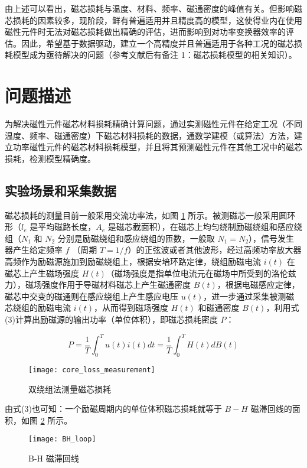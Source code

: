 \documentclass[a4paper,12pt]{ctexart}
\begin{document}
由上述可以看出，磁芯损耗与温度、材料、频率、磁通密度的峰值有关。但影响磁芯损耗的因素较多，现阶段，鲜有普遍适用并且精度高的模型，这使得业内在使用磁性元件时无法对磁芯损耗做出精确的评估，进而影响到对功率变换器效率的评估。因此，希望基于数据驱动，建立一个高精度并且普遍适用于各种工况的磁芯损耗模型成为亟待解决的问题（参考文献后有备注 1：磁芯损耗模型的相关知识）。

\section{问题描述}

为解决磁性元件磁芯材料损耗精确计算问题，通过实测磁性元件在给定工况（不同温度、频率、磁通密度）下磁芯材料损耗的数据，通数学建模（或算法）方法，建立功率磁性元件的磁芯材料损耗模型，并且将其预测磁性元件在其他工况中的磁芯损耗，检测模型精确度。

\subsection{实验场景和采集数据}

磁芯损耗的测量目前一般采用交流功率法，如图 \ref{fig:core_loss_measurement} 所示。被测磁芯一般采用圆环形（$l_e$ 是平均磁路长度，$A_e$ 是磁芯截面积），在磁芯上均匀绕制励磁绕组和感应绕组（$N_1$ 和 $N_2$ 分别是励磁绕组和感应绕组的匝数，一般取 $N_1 = N_2$），信号发生器产生给定频率 $f$ （周期 $T=1/f$）的正弦波或者其他波形，经过高频功率放大器高频作为励磁源施加到励磁绕组上，根据安培环路定律，绕组励磁电流 $i(t)$ 在磁芯上产生磁场强度 $H(t)$（磁场强度是指单位电流元在磁场中所受到的洛伦兹力），磁场强度作用于导磁材料磁芯上产生磁通密度 $B(t)$，根据电磁感应定律，磁芯中交变的磁通则在感应绕组上产生感应电压 $u(t)$，进一步通过采集被测磁芯绕组的励磁电流 $i(t)$，从而得到磁场强度 $H(t)$ 和磁通密度 $B(t)$，利用式(3)计算出励磁源的输出功率（单位体积），即磁芯损耗密度 $P$：

\begin{equation}
P = \frac{1}{T} \int_0^T u(t) i(t) dt = \frac{1}{T} \int_0^T H(t) dB(t)
\end{equation}

\begin{figure}[H]
\centering
\texttt{[image: core\_loss\_measurement]}
\caption{双绕组法测量磁芯损耗}
\label{fig:core_loss_measurement}
\end{figure}

由式(3)也可知：一个励磁周期内的单位体积磁芯损耗就等于 $B-H$ 磁滞回线的面积，如图 \ref{fig:BH_loop} 所示。

\begin{figure}[H]
\centering
\texttt{[image: BH\_loop]}
\caption{B-H 磁滞回线}
\label{fig:BH_loop}
\end{figure}
\end{document}
